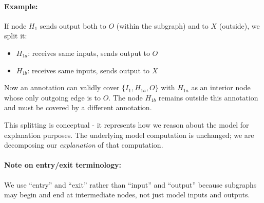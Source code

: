 \documentclass{article}
\begin{document}
\paragraph{Example:} If node $H_1$ sends output both to $O$ (within the subgraph) and to $X$ (outside), we split it:
\begin{itemize}
    \item $H_{1a}$: receives same inputs, sends output to $O$
    \item $H_{1b}$: receives same inputs, sends output to $X$
\end{itemize}

Now an annotation can validly cover $\{I_1, H_{1a}, O\}$ with $H_{1a}$ as an interior node whose only outgoing edge is to $O$. The node $H_{1b}$ remains outside this annotation and must be covered by a different annotation.

This splitting is conceptual - it represents how we reason about the model for explanation purposes. The underlying model computation is unchanged; we are decomposing our \emph{explanation} of that computation.

\paragraph{Note on entry/exit terminology:} We use ``entry'' and ``exit'' rather than ``input'' and ``output'' because subgraphs may begin and end at intermediate nodes, not just model inputs and outputs.
\end{document}
